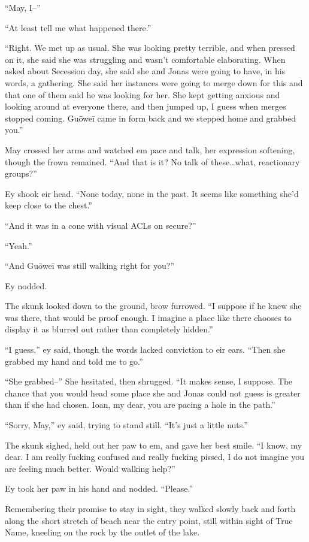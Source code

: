 ``May, I--''

``At least tell me what happened there.''

``Right. We met up as usual. She was looking pretty terrible, and when pressed on it, she said she was struggling and wasn't comfortable elaborating. When asked about Secession day, she said she and Jonas were going to have, in his words, a gathering. She said her instances were going to merge down for this and that one of them said he was looking for her. She kept getting anxious and looking around at everyone there, and then jumped up, I guess when merges stopped coming. Guōweī came in form back and we stepped home and grabbed you.''

May crossed her arms and watched em pace and talk, her expression softening, though the frown remained. ``And that is it? No talk of these\ldots what, reactionary groups?''

Ey shook eir head. ``None today, none in the past. It seems like something she'd keep close to the chest.''

``And it was in a cone with visual ACLs on secure?''

``Yeah.''

``And Guōweī was still walking right for you?''

Ey nodded.

The skunk looked down to the ground, brow furrowed. ``I suppose if he knew she was there, that would be proof enough. I imagine a place like there chooses to display it as blurred out rather than completely hidden.''

``I guess,'' ey said, though the words lacked conviction to eir ears. ``Then she grabbed my hand and told me to go.''

``She grabbed--'' She hesitated, then shrugged. ``It makes sense, I suppose. The chance that you would head some place she and Jonas could not guess is greater than if she had chosen. Ioan, my dear, you are pacing a hole in the path.''

``Sorry, May,'' ey said, trying to stand still. ``It's just a little nuts.''

The skunk sighed, held out her paw to em, and gave her best smile. ``I know, my dear. I am really fucking confused and really fucking pissed, I do not imagine you are feeling much better. Would walking help?''

Ey took her paw in his hand and nodded. ``Please.''

Remembering their promise to stay in sight, they walked slowly back and forth along the short stretch of beach near the entry point, still within sight of True Name, kneeling on the rock by the outlet of the lake.


